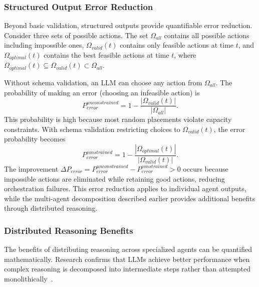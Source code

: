 \subsubsection{Structured Output Error Reduction}

Beyond basic validation, structured outputs provide quantifiable error reduction. Consider three sets of possible actions. The set $\Omega_{all}$ contains all possible actions including impossible ones, $\Omega_{valid}(t)$ contains only feasible actions at time $t$, and $\Omega_{optimal}(t)$ contains the best feasible actions at time $t$, where $\Omega_{optimal}(t) \subseteq \Omega_{valid}(t) \subset \Omega_{all}$.

Without schema validation, an \ac{LLM} can choose any action from $\Omega_{all}$. The probability of making an error (choosing an infeasible action) is
\begin{equation}
P_{error}^{unconstrained} = 1 - \frac{|\Omega_{valid}(t)|}{|\Omega_{all}|}.
\label{eq:ch2_unconstrained_error}
\end{equation}
This probability is high because most random placements violate capacity constraints. With schema validation restricting choices to $\Omega_{valid}(t)$, the error probability becomes
\begin{equation}
P_{error}^{constrained} = 1 - \frac{|\Omega_{optimal}(t)|}{|\Omega_{valid}(t)|}.
\label{eq:ch2_constrained_error}
\end{equation}
The improvement $\Delta P_{error} = P_{error}^{unconstrained} - P_{error}^{constrained} > 0$ occurs because impossible actions are eliminated while retaining good actions, reducing orchestration failures. This error reduction applies to individual agent outputs, while the multi-agent decomposition described earlier provides additional benefits through distributed reasoning.

\subsubsection{Distributed Reasoning Benefits}

The benefits of distributing reasoning across specialized agents can be quantified mathematically. Research confirms that \acp{LLM} achieve better performance when complex reasoning is decomposed into intermediate steps rather than attempted monolithically~\cite{chainofthought2022}.

